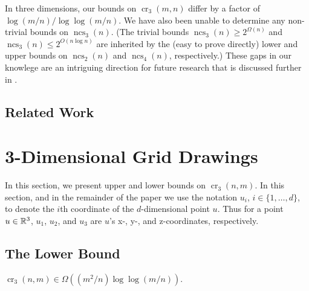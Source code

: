 \documentclass{patmorin}
\DeclareMathOperator{\crs}{cr}
\DeclareMathOperator{\ncs}{ncs}
\begin{document}
In three dimensions, our bounds on $\crs_3(m,n)$ differ by a factor of
$\log(m/n)/\log\log(m/n)$.  We have also been unable to determine any
non-trivial bounds on $\ncs_3(n)$.  (The trivial bounds $\ncs_3(n)\ge
2^{\Omega(n)}$ and $\ncs_3(n)\le 2^{O(n\log n)}$ are inherited by
the (easy to prove directly) lower and upper bounds on $\ncs_2(n)$
and $\ncs_4(n)$, respectively.)  These gaps in our knowlege are an
intriguing direction for future research that is discussed further in
.

\subsection{Related Work}


\section{3-Dimensional Grid Drawings}

In this section, we present upper and lower bounds on $\crs_3(n,m)$.
In this section, and in the remainder of the paper we use the notation
$u_i$, $i\in\{1,\ldots,d\}$, to denote the $i$th coordinate of the
$d$-dimensional point $u$.  Thus for a point $u\in\mathbb{R}^3$, $u_1$, $u_2$,
and $u_3$ are $u$'s x-, y-, and z-coordinates, respectively.

\subsection{The Lower Bound}

\begin{thm}
  $\crs_3(n,m) \in \Omega((m^2/n)\log\log (m/n))$.
\end{thm}
\end{document}
